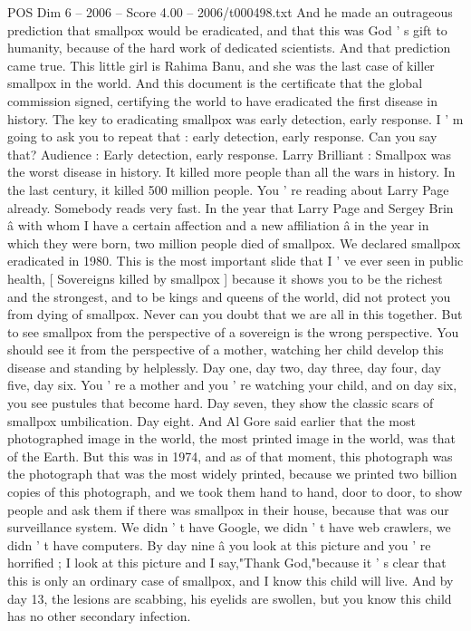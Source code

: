 \begin{textsample}{POS Dim 6 – 2006 – Score 4.00 – 2006/t000498.txt}
And he made an outrageous prediction that smallpox would be eradicated, and that this was God ' s gift to humanity, because of the hard work of dedicated scientists.
And that prediction came true.
This little girl is Rahima Banu, and she was the last case of killer smallpox in the world.
And this document is the certificate that the global commission signed, certifying the world to have eradicated the first disease in history.
The key to eradicating smallpox was early detection, early response.
I ' m going to ask you to repeat that : early detection, early response.
Can you say that?
Audience : Early detection, early response.
Larry Brilliant : Smallpox was the worst disease in history.
It killed more people than all the wars in history.
In the last century, it killed 500 million people.
You ' re reading about Larry Page already.
Somebody reads very fast.
In the year that Larry Page and Sergey Brin â with whom I have a certain affection and a new affiliation â in the year in which they were born, two million people died of smallpox.
We declared smallpox eradicated in 1980.
This is the most important slide that I ' ve ever seen in public health, [ Sovereigns killed by smallpox ] because it shows you to be the richest and the strongest, and to be kings and queens of the world, did not protect you from dying of smallpox.
Never can you doubt that we are all in this together.
But to see smallpox from the perspective of a sovereign is the wrong perspective.
You should see it from the perspective of a mother, watching her child develop this disease and standing by helplessly.
Day one, day two, day three, day four, day five, day six.
You ' re a mother and you ' re watching your child, and on day six, you see pustules that become hard.
Day seven, they show the classic scars of smallpox umbilication.
Day eight.
And Al Gore said earlier that the most photographed image in the world, the most printed image in the world, was that of the Earth.
But this was in 1974, and as of that moment, this photograph was the photograph that was the most widely printed, because we printed two billion copies of this photograph, and we took them hand to hand, door to door, to show people and ask them if there was smallpox in their house, because that was our surveillance system.
We didn ' t have Google, we didn ' t have web crawlers, we didn ' t have computers.
By day nine â you look at this picture and you ' re horrified ; I look at this picture and I say,"Thank God,"because it ' s clear that this is only an ordinary case of smallpox, and I know this child will live.
And by day 13, the lesions are scabbing, his eyelids are swollen, but you know this child has no other secondary infection.

\end{textsample}
